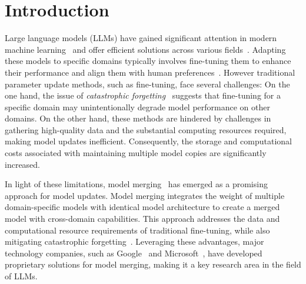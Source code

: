 \section{Introduction}

Large language models (LLMs) have gained significant attention in modern machine learning~\cite{brown2020language, touvron2023llama, dubey2024llama, bai2023qwen} and offer efficient solutions across various fields~\cite{li2024ecomgpt, wu2024chateda, lu2024chameleon}. Adapting these models to specific domains typically involves fine-tuning them to enhance their performance and align them with human preferences~\cite{wang2023aligning, shen2023large}. However traditional parameter update methods, such as fine-tuning, face several challenges: On the one hand, the issue of \textit{catastrophic forgetting}~\cite{kemker2018measuring} suggests that fine-tuning for a specific domain may unintentionally degrade model performance on other domains. On the other hand, these methods are hindered by challenges in gathering high-quality data and the substantial computing resources required, making model updates inefficient. Consequently, the storage and computational costs associated with maintaining multiple model copies are significantly increased.


In light of these limitations, model merging~\cite{jindataless, yangadamerging, yangrepresentation, yu2024language} has emerged as a promising approach for model updates. Model merging integrates the weight of multiple domain-specific models with identical model architecture to create a merged model with cross-domain capabilities. This approach addresses the data and computational resource requirements of traditional fine-tuning, while also mitigating catastrophic forgetting~\cite{liu2023tangent, alexandrov2024mitigating}. Leveraging these advantages, major technology companies, such as Google~\cite{wortsman2022model} and Microsoft~\cite{ilharcoediting}, have developed proprietary solutions for model merging, making it a key research area in the field of LLMs.


